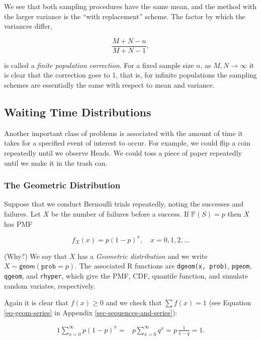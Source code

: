 \documentclass[]{book}
\numberwithin{equation}{chapter}
\numberwithin{figure}{chapter}
\theoremstyle{plain}
\theoremstyle{definition}
\theoremstyle{remark}
\theoremstyle{definition}
\theoremstyle{definition}
\theoremstyle{remark}
\begin{document}
We see that both sampling procedures have the same mean, and the method
with the larger variance is the ``with replacement'' scheme. The factor
by which the variances differ,

\begin{equation}
\frac{M+N-n}{M+N-1},
\end{equation}

is called a \emph{finite population correction}. For a fixed sample size
\(n\), as \(M,N\to\infty\) it is clear that the correction goes to 1,
that is, for infinite populations the sampling schemes are essentially
the same with respect to mean and variance.

\subsection{Waiting Time
Distributions}\label{sec-waiting-time-distributions}

Another important class of problems is associated with the amount of
time it takes for a specified event of interest to occur. For example,
we could flip a coin repeatedly until we observe Heads. We could toss a
piece of paper repeatedly until we make it in the trash can.

\subsubsection{The Geometric
Distribution}\label{sub-the-geometric-distribution}

Suppose that we conduct Bernoulli trials repeatedly, noting the
successes and failures. Let \(X\) be the number of failures before a
success. If \(\mathbb{P}(S)=p\) then \(X\) has PMF

\begin{equation}
f_{X}(x)=p(1-p)^{x},\quad x=0,1,2,\ldots
\end{equation}

(Why?) We say that \(X\) has a \emph{Geometric distribution} and we
write \(X\sim\mathsf{geom}(\mathtt{prob}=p)\). The associated R
functions are \texttt{dgeom(x,\ prob)}, \texttt{pgeom}, \texttt{qgeom},
and \texttt{rhyper}, which give the PMF, CDF, quantile function, and
simulate random variates, respectively.

Again it is clear that \(f(x)\geq0\) and we check that \(\sum f(x)=1\)
(see Equation \eqref{eq-geom-series} in Appendix
\ref{sec-sequences-and-series}):

\begin{alignat*}{1}
\sum_{x=0}^{\infty}p(1-p)^{x}= & p\sum_{x=0}^{\infty}q^{x}=p\,\frac{1}{1-q}=1.
\end{alignat*}
\end{document}
